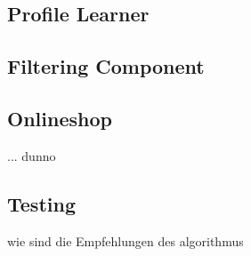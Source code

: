 \subsection{Profile Learner}

\subsection{Filtering Component}



\subsection{Onlineshop}
... dunno

\subsection{Testing}
wie sind die Empfehlungen des algorithmus








